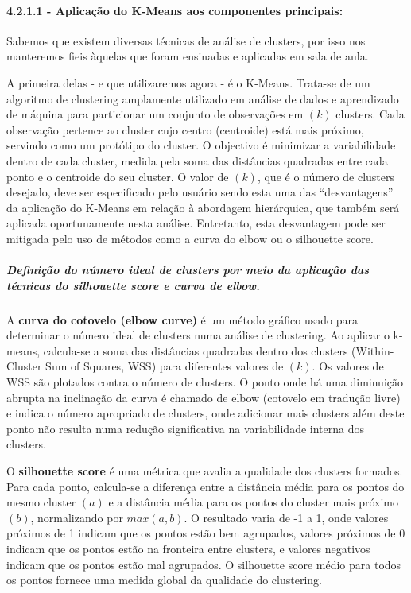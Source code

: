 \documentclass[
  letterpaper,
  DIV=11,
  numbers=noendperiod]{scrartcl}
\let\oldparagraph\paragraph
\renewcommand{\paragraph}[1]{\oldparagraph{#1}\mbox{}}
\let\oldsubparagraph\subparagraph
\renewcommand{\subparagraph}[1]{\oldsubparagraph{#1}\mbox{}}
\begin{document}
\paragraph{4.2.1.1 - Aplicação do K-Means aos componentes
principais:}\label{aplicauxe7uxe3o-do-k-means-aos-componentes-principais}

Sabemos que existem diversas técnicas de análise de clusters, por isso
nos manteremos fieis àquelas que foram ensinadas e aplicadas em sala de
aula.

A primeira delas - e que utilizaremos agora - é o K-Means. Trata-se de
um algoritmo de clustering amplamente utilizado em análise de dados e
aprendizado de máquina para particionar um conjunto de observações em
\(( k )\) clusters. Cada observação pertence ao cluster cujo centro
(centroide) está mais próximo, servindo como um protótipo do cluster. O
objectivo é minimizar a variabilidade dentro de cada cluster, medida
pela soma das distâncias quadradas entre cada ponto e o centroide do seu
cluster. O valor de \(( k )\), que é o número de clusters desejado, deve
ser especificado pelo usuário sendo esta uma das ``desvantagens'' da
aplicação do K-Means em relação à abordagem hierárquica, que também será
aplicada oportunamente nesta análise. Entretanto, esta desvantagem pode
ser mitigada pelo uso de métodos como a curva do elbow ou o silhouette
score.

\subparagraph{\texorpdfstring{\textbf{Definição do número ideal de
clusters por meio da aplicação das técnicas do silhouette score e curva
de
elbow.}}{Definição do número ideal de clusters por meio da aplicação das técnicas do silhouette score e curva de elbow.}}\label{definiuxe7uxe3o-do-nuxfamero-ideal-de-clusters-por-meio-da-aplicauxe7uxe3o-das-tuxe9cnicas-do-silhouette-score-e-curva-de-elbow.}

A \textbf{curva do cotovelo (elbow curve)} é um método gráfico usado
para determinar o número ideal de clusters numa análise de clustering.
Ao aplicar o k-means, calcula-se a soma das distâncias quadradas dentro
dos clusters (Within-Cluster Sum of Squares, WSS) para diferentes
valores de \(( k )\). Os valores de WSS são plotados contra o número de
clusters. O ponto onde há uma diminuição abrupta na inclinação da curva
é chamado de elbow (cotovelo em tradução livre) e indica o número
apropriado de clusters, onde adicionar mais clusters além deste ponto
não resulta numa redução significativa na variabilidade interna dos
clusters.

O \textbf{silhouette score} é uma métrica que avalia a qualidade dos
clusters formados. Para cada ponto, calcula-se a diferença entre a
distância média para os pontos do mesmo cluster \((a)\) e a distância
média para os pontos do cluster mais próximo \((b)\), normalizando por
\(max(a, b)\). O resultado varia de -1 a 1, onde valores próximos de 1
indicam que os pontos estão bem agrupados, valores próximos de 0 indicam
que os pontos estão na fronteira entre clusters, e valores negativos
indicam que os pontos estão mal agrupados. O silhouette score médio para
todos os pontos fornece uma medida global da qualidade do clustering.
\end{document}
